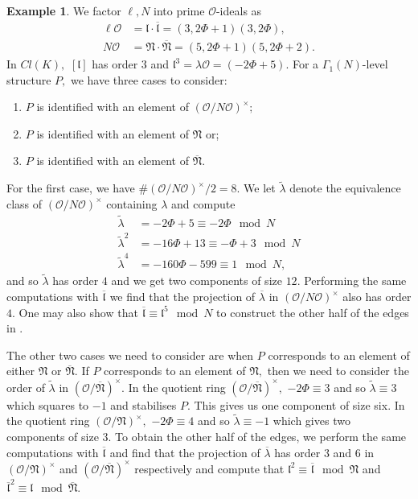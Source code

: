 \documentclass[11pt,a4paper]{amsart}
\theoremstyle{plain}
\theoremstyle{definition}
\newtheorem{eg}[thm]{Example}
\theoremstyle{remark}
\begin{document}
\begin{eg}
  We factor $\ell, N$ into prime $\mathcal{O}$-ideals as
  \begin{align*}
    \ell\mathcal{O} &= \mathfrak{l} \cdot \overline{\mathfrak{l}} = (3, 2\Phi + 1)(3, 2\Phi), \\
    N\mathcal{O} &= \mathfrak{N} \cdot \overline{\mathfrak{N}} = (5, 2\Phi + 1)(5, 2\Phi + 2).
  \end{align*}
  In $Cl(K),$ $[\mathfrak{l}]$ has order $3$ and $\mathfrak{l}^3 = \lambda\mathcal{O} = (-2\Phi + 5).$ For a $\Gamma_1(N)$-level structure $P,$ we have three cases to consider:
  \begin{enumerate}[label=(\roman*)]
  \item $P$ is identified with an element of $(\mathcal{O}/N\mathcal{O})^{\times};$
  \item $P$ is identified with an element of $\mathfrak{N}$ or;
  \item $P$ is identified with an element of $\overline{\mathfrak{N}}.$
  \end{enumerate}
  For the first case, we have $\#(\mathcal{O}/N\mathcal{O})^{\times}/2 = 8.$ We let $\tilde{\lambda}$ denote the equivalence class of $(\mathcal{O}/N\mathcal{O})^{\times}$ containing $\lambda$ and compute
  \begin{align*}
    \tilde{\lambda} &= -2\Phi + 5 \equiv -2\Phi \mod{N} \\
    \tilde{\lambda}^2 &= -16\Phi + 13 \equiv -\Phi + 3 \mod{N} \\
    \tilde{\lambda}^4 &= -160\Phi - 599 \equiv 1 \mod{N},
  \end{align*}
  and so $\tilde{\lambda}$ has order $4$ and we get two components of size $12.$ Performing the same computations with $\overline{\mathfrak{l}}$ we find that the projection of $\overline{\lambda}$ in $(\mathcal{O}/N\mathcal{O})^{\times}$ also has order $4.$ One may also show that $\overline{\mathfrak{l}} \equiv \mathfrak{l}^5 \mod N$ to construct the other half of the edges in .

  The other two cases we need to consider are when $P$ corresponds to an element of either $\mathfrak{N}$ or $\overline{\mathfrak{N}}.$ If $P$ corresponds to an element of $\mathfrak{N},$ then we need to consider the order of $\tilde{\lambda}$ in $(\mathcal{O}/\overline{\mathfrak{N}})^{\times}.$ In the quotient ring $(\mathcal{O}/\overline{\mathfrak{N}})^{\times},$ $-2\Phi \equiv 3$ and so $\tilde{\lambda} \equiv 3$ which squares to $-1$ and stabilises $P.$ This gives us one component of size six. In the quotient ring $(\mathcal{O}/\mathfrak{N})^{\times},$ $-2\Phi \equiv 4$ and so $\tilde{\lambda} \equiv -1$ which gives two components of size $3.$ To obtain the other half of the edges, we perform the same computations with $\overline{\mathfrak{l}}$ and find that the projection of $\overline{\lambda}$ has order $3$ and $6$ in $(\mathcal{O}/\mathfrak{N})^{\times}$ and $(\mathcal{O}/\overline{\mathfrak{N}})^{\times}$ respectively and compute that $\mathfrak{l}^{2} \equiv \overline{\mathfrak{l}} \mod \mathfrak{N}$ and $\overline{\mathfrak{l}}^2 \equiv \mathfrak{l} \mod \overline{\mathfrak{N}}.$
\end{eg}



\end{document}
